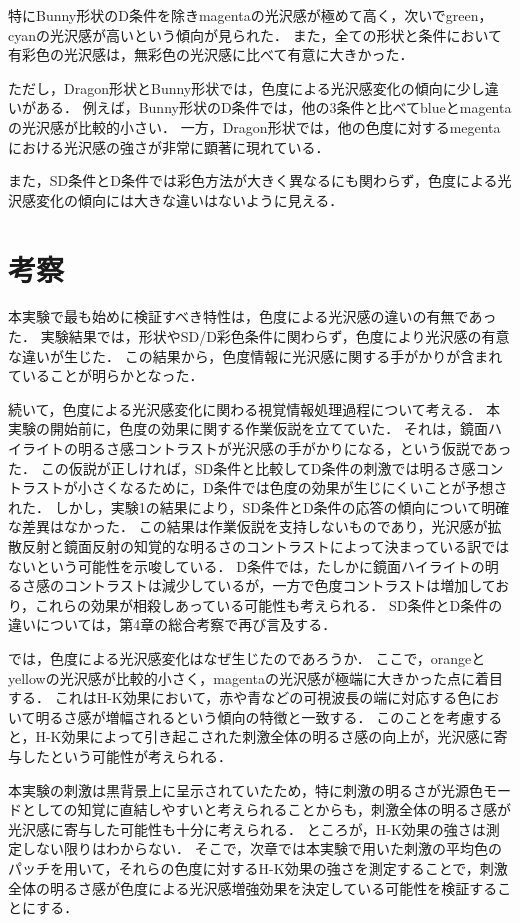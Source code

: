             特にBunny形状のD条件を除きmagentaの光沢感が極めて高く，次いでgreen，cyanの光沢感が高いという傾向が見られた．
            また，全ての形状と条件において有彩色の光沢感は，無彩色の光沢感に比べて有意に大きかった．


            ただし，Dragon形状とBunny形状では，色度による光沢感変化の傾向に少し違いがある．
            例えば，Bunny形状のD条件では，他の3条件と比べてblueとmagentaの光沢感が比較的小さい．
            一方，Dragon形状では，他の色度に対するmegentaにおける光沢感の強さが非常に顕著に現れている．

            また，SD条件とD条件では彩色方法が大きく異なるにも関わらず，色度による光沢感変化の傾向には大きな違いはないように見える．


    \section{考察}
        本実験で最も始めに検証すべき特性は，色度による光沢感の違いの有無であった．
        実験結果では，形状やSD/D彩色条件に関わらず，色度により光沢感の有意な違いが生じた．
        この結果から，色度情報に光沢感に関する手がかりが含まれていることが明らかとなった．
        
        続いて，色度による光沢感変化に関わる視覚情報処理過程について考える．
        本実験の開始前に，色度の効果に関する作業仮説を立てていた．
        それは，鏡面ハイライトの明るさ感コントラストが光沢感の手がかりになる，という仮説であった．
        この仮説が正しければ，SD条件と比較してD条件の刺激では明るさ感コントラストが小さくなるために，D条件では色度の効果が生じにくいことが予想された．
        しかし，実験1の結果により，SD条件とD条件の応答の傾向について明確な差異はなかった．
        この結果は作業仮説を支持しないものであり，光沢感が拡散反射と鏡面反射の知覚的な明るさのコントラストによって決まっている訳ではないという可能性を示唆している．
        D条件では，たしかに鏡面ハイライトの明るさ感のコントラストは減少しているが，一方で色度コントラストは増加しており，これらの効果が相殺しあっている可能性も考えられる．
        SD条件とD条件の違いについては，第4章の総合考察で再び言及する．

        では，色度による光沢感変化はなぜ生じたのであろうか．
        ここで，orangeとyellowの光沢感が比較的小さく，magentaの光沢感が極端に大きかった点に着目する．
        これはH-K効果において，赤や青などの可視波長の端に対応する色において明るさ感が増幅されるという傾向\cite{HKeffect}の特徴と一致する．
        このことを考慮すると，H-K効果によって引き起こされた刺激全体の明るさ感の向上が，光沢感に寄与したという可能性が考えられる．

        本実験の刺激は黒背景上に呈示されていたため，特に刺激の明るさが光源色モード\cite{LightMode}としての知覚に直結しやすいと考えられることからも，刺激全体の明るさ感が光沢感に寄与した可能性も十分に考えられる．
        ところが，H-K効果の強さは測定しない限りはわからない．
        そこで，次章では本実験で用いた刺激の平均色のパッチを用いて，それらの色度に対するH-K効果の強さを測定することで，刺激全体の明るさ感が色度による光沢感増強効果を決定している可能性を検証することにする．

    \newpage